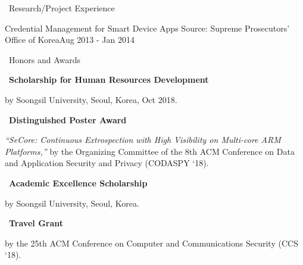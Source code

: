 \documentclass{resume} %
\begin{document}
\begin{rSection}{\faGenderless~Research/Project Experience}
	\begin{rSubsection3}
		{Credential Management for Smart Device Apps}
		{Source: Supreme Prosecutors' Office of Korea}{Aug 2013 - Jan 2014}
	\end{rSubsection3}
\end{rSection}


\begin{rSection}{\faGenderless~Honors and Awards}

	\strut\textbullet~{\bf Scholarship for Human Resources Development}\\
	\strut\hspace{1cm}by Soongsil University, Seoul, Korea, Oct 2018.

	\strut\textbullet~{\bf Distinguished Poster Award}\\
	\strut\hspace{1cm}\parbox[t]{\linegoal}{\emph{``SeCore: Continuous Extrospection with High Visibility on Multi-core ARM Platforms,''} by the Organizing Committee of the 8th ACM Conference on Data and Application Security and Privacy (CODASPY `18).}

	\strut\textbullet~{\bf Academic Excellence Scholarship}\\
	\strut\hspace{1cm}by Soongsil University, Seoul, Korea.

	\strut\textbullet~{\bf Travel Grant}\\
	\strut\hspace{1cm}by the 25th ACM Conference on Computer and Communications Security (CCS `18).

\end{rSection}

\end{document}

